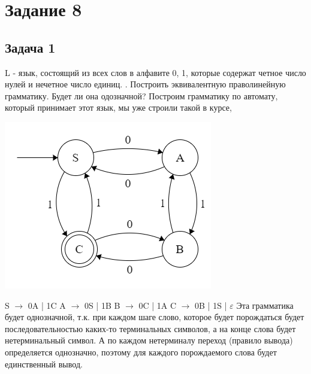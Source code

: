 \documentclass[a4paper,14pt]{article} %
\begin{document}

\section{Задание 8}
\subsection{Задача 1}
L - язык, состоящий из всех слов в алфавите {0, 1}, которые содержат четное число нулей и нечетное число единиц.
. Построить эквивалентную праволинейную грамматику. Будет ли она одозначной?
Построим грамматику по автомату, который принимает этот язык, мы уже строили такой в курсе,
\newline
\begin{center}
\includegraphics{03.png}
\end{center}
S $\longrightarrow$ 0A | 1C %
\newline
A $\longrightarrow$ 0S | 1B %
\newline
B $\longrightarrow$ 0C | 1A %
\newline
C $\longrightarrow$ 0B | 1S | $\varepsilon$ %
\newline
Эта грамматика будет однозначной, т.к. при каждом шаге слово, которое будет порождаться будет последовательностью каких-то терминальных символов, а на конце слова будет нетерминальный символ.
А по каждом нетерминалу переход (правило вывода) определяется однозначно, поэтому для каждого порождаемого слова будет единственный вывод.
\end{document}
